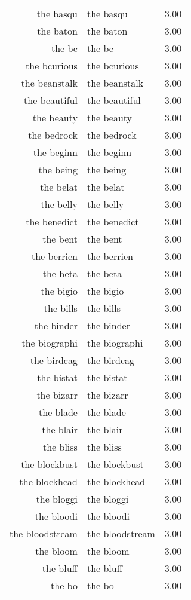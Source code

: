 \begin{table}[ht]
\begin{tabular}{rlr}
  the basqu & the basqu & 3.00 \\ 
  the baton & the baton & 3.00 \\ 
  the bc & the bc & 3.00 \\ 
  the bcurious & the bcurious & 3.00 \\ 
  the beanstalk & the beanstalk & 3.00 \\ 
  the beautiful & the beautiful & 3.00 \\ 
  the beauty & the beauty & 3.00 \\ 
  the bedrock & the bedrock & 3.00 \\ 
  the beginn & the beginn & 3.00 \\ 
  the being & the being & 3.00 \\ 
  the belat & the belat & 3.00 \\ 
  the belly & the belly & 3.00 \\ 
  the benedict & the benedict & 3.00 \\ 
  the bent & the bent & 3.00 \\ 
  the berrien & the berrien & 3.00 \\ 
  the beta & the beta & 3.00 \\ 
  the bigio & the bigio & 3.00 \\ 
  the bills & the bills & 3.00 \\ 
  the binder & the binder & 3.00 \\ 
  the biographi & the biographi & 3.00 \\ 
  the birdcag & the birdcag & 3.00 \\ 
  the bistat & the bistat & 3.00 \\ 
  the bizarr & the bizarr & 3.00 \\ 
  the blade & the blade & 3.00 \\ 
  the blair & the blair & 3.00 \\ 
  the bliss & the bliss & 3.00 \\ 
  the blockbust & the blockbust & 3.00 \\ 
  the blockhead & the blockhead & 3.00 \\ 
  the bloggi & the bloggi & 3.00 \\ 
  the bloodi & the bloodi & 3.00 \\ 
  the bloodstream & the bloodstream & 3.00 \\ 
  the bloom & the bloom & 3.00 \\ 
  the bluff & the bluff & 3.00 \\ 
  the bo & the bo & 3.00 \\ 

\end{tabular}
\end{table}
